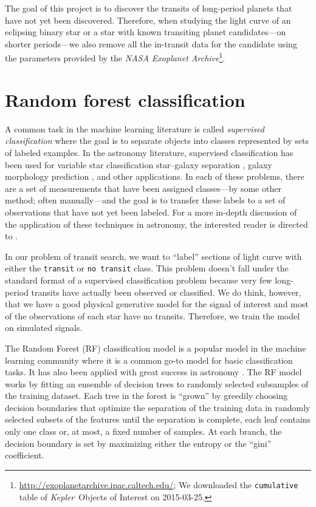\documentclass[12pt,preprint]{aastex}
\newcommand{\project}[1]{\textsl{#1}}
\newcommand{\kepler}{\project{Kepler}}
\newcommand{\sectlabel}[1]{\label{sect:#1}}
\begin{document}
The goal of this project is to discover the transits of long-period planets
that have not yet been discovered.
Therefore, when studying the light curve of an eclipsing binary star or a star
with known transiting planet candidates---on shorter periods---we also remove
all the in-transit data for the candidate using the parameters provided by the
\project{NASA Exoplanet
Archive}\footnote{\url{http://exoplanetarchive.ipac.caltech.edu/}; We
downloaded the \texttt{cumulative} table of \kepler\ Objects of Interest on
2015-03-25.}.



\section{Random forest classification}\sectlabel{rfc}

A common task in the machine learning literature is called \emph{supervised
classification} where the goal is to separate objects into classes
represented by sets of labeled examples.
In the astronomy literature, supervised classification has been used for
variable star classification \citep{Richards:2011} star--galaxy separation
\citep{Fadely:2012}, galaxy morphology prediction \citep{Dieleman:2015}, and
other applications.
In each of these problems, there are a set of measurements that have been
assigned classes---by some other method; often manually---and the goal is to
transfer these labels to a set of observations that have not yet been
labeled.
For a more in-depth discussion of the application of these techniques in
astronomy, the interested reader is directed to \citet{Ivezic:2013}.

In our problem of transit search, we want to ``label'' sections of light curve
with either the \texttt{transit} or \texttt{no transit} class.
This problem doesn't fall under the standard format of a supervised
classification problem because very few long-period transits have actually
been observed or classified.
We do think, however, that we have a good physical generative model for the
signal of interest and most of the observations of each star have no transits.
Therefore, we train the model on simulated signals.

The Random Forest (RF) classification model \citep{Breiman:2001} is a popular
model in the machine learning community where it is a common go-to model for
basic classification tasks.
It has also been applied with great success in astronomy \citep[for
example][]{Richards:2011, Richards:2012, Jenkins:2014}.
The RF model works by fitting an ensemble of decision trees to randomly
selected subsamples of the training dataset.
Each tree in the forest is ``grown'' by greedily choosing decision boundaries
that optimize the separation of the training data in randomly selected
subsets of the features until the separation is complete, each leaf contains
only one class or, at most, a fixed number of samples.
At each branch, the decision boundary is set by maximizing either the entropy
or the ``gini'' coefficient.
\end{document}
